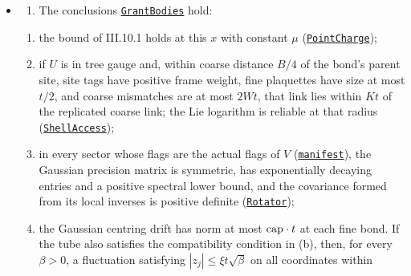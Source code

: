 \documentclass[
  letterpaper,
  11pt]{article}
\providecommand{\tightlist}{%
  \setlength{\itemsep}{0pt}\setlength{\parskip}{0pt}}
\begin{document}
\begin{itemize}
\item
  \begin{enumerate}
  \def\labelenumi{(\alph{enumi})}
  \tightlist
  \item
    The conclusions
    \href{https://github.com/yang-mills-group/OpenAI-YM-20261028/blob/3456e5e75cf8d4cd558955a5c7638fba2d68f464/YM/AnalyticNext/CONNECTED_ACTIVITY_JETS_E6/Issue.lean\#L51-L71}{\texttt{GrantBodies}}
    hold:
  \end{enumerate}

  \begin{enumerate}
  \def\labelenumi{\arabic{enumi}.}
  \tightlist
  \item
    the bound of III.10.1 holds at this \(x\) with constant \(\mu\)
    (\href{https://github.com/yang-mills-group/OpenAI-YM-20261028/blob/3456e5e75cf8d4cd558955a5c7638fba2d68f464/YM/Push/SECTOR_MEASURE/Oriented.lean\#L29-L32}{\texttt{PointCharge}});
  \item
    if \(U\) is in tree gauge and, within coarse distance \(B/4\) of the
    bond's parent site, site tags have positive frame weight, fine
    plaquettes have size at most \(t/2\), and coarse mismatches are at
    most \(2Wt\), that link lies within \(Kt\) of the replicated coarse
    link; the Lie logarithm is reliable at that radius
    (\href{https://github.com/yang-mills-group/OpenAI-YM-20261028/blob/3456e5e75cf8d4cd558955a5c7638fba2d68f464/YM/AnalyticNext/CONNECTED_ACTIVITY_JETS_E6/Coat.lean\#L25-L29}{\texttt{ShellAccess}});
  \item
    in every sector whose flags are the actual flags of \(V\)
    (\href{https://github.com/yang-mills-group/OpenAI-YM-20261028/blob/3456e5e75cf8d4cd558955a5c7638fba2d68f464/YM/AnalyticNext/CONNECTED_ACTIVITY_JETS_E6/Currents.lean\#L21}{\texttt{manifest}}),
    the Gaussian precision matrix is symmetric, has exponentially
    decaying entries and a positive spectral lower bound, and the
    covariance formed from its local inverses is positive definite
    (\href{https://github.com/yang-mills-group/OpenAI-YM-20261028/blob/3456e5e75cf8d4cd558955a5c7638fba2d68f464/YM/AnalyticNext/CONNECTED_ACTIVITY_JETS_E6/Shutter.lean\#L110-L117}{\texttt{Rotator}});
  \item
    the Gaussian centring drift has norm at most \({\rm cap}\cdot t\) at
    each fine bond. If the tube also satisfies the compatibility
    condition in (b), then, for every \(\beta>0\), a fluctuation
    satisfying \(|z_j|\le\xi t\sqrt\beta\) on all coordinates within

\end{enumerate}
\end{itemize}
\end{document}
